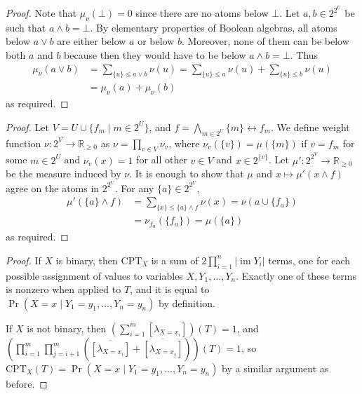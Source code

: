 \documentclass[letterpaper]{article} %
\DeclareMathOperator{\im}{im}
\theoremstyle{definition}
\theoremstyle{remark}
\begin{document}
{\measure*
\begin{proof}
  Note that $\mu_\nu(\bot) = 0$ since there are no atoms below $\bot$. Let $a, b
  \in 2^{2^{U}}$ be such that $a \land b = \bot$. By elementary properties of
  Boolean algebras, all atoms below $a \lor b$ are either below $a$ or below
  $b$. Moreover, none of them can be below both $a$ and $b$ because then they
  would have to be below $a \land b = \bot$. Thus
  \begin{align*}
    \mu_\nu(a \lor b) &= \sum_{\{u\} \le a \lor b} \nu(u) = \sum_{\{u\} \le a} \nu(u) + \sum_{\{u\} \le b} \nu(u) \\
                      &= \mu_\nu(a) + \mu_\nu(b)
  \end{align*}
  as required.
\end{proof}

\extendable*
\begin{proof}
  Let $V = U \cup \{ f_m \mid m \in 2^U \}$, and $f = \bigwedge_{m \in 2^U} \{ m
  \} \leftrightarrow f_m$. We define weight function $\nu\colon 2^V \to
  \mathbb{R}_{\ge 0}$ as $\nu = \prod_{v \in V} \nu_v$, where $\nu_v(\{v\}) =
  \mu(\{m\})$ if $v = f_m$ for some $m \in 2^U$ and $\nu_v(x) = 1$ for all other
  $v \in V$ and $x \in 2^{\{v\}}$. Let $\mu'\colon 2^{2^V} \to \mathbb{R}_{\ge
    0}$ be the measure induced by $\nu$. It is enough to show that $\mu$ and $x
  \mapsto \mu'(x \land f)$ agree on the atoms in $2^{2^U}$. For any $\{ a \} \in
  2^{2^U}$,
  \begin{align*}
    \mu'(\{ a \} \land f) &= \sum_{\{ x \} \le \{ a \} \land f} \nu(x) = \nu(a \cup \{ f_a \}) \\
                          &= \nu_{f_a}(\{ f_a \}) = \mu(\{ a \})
  \end{align*}
  as required.
\end{proof}

\cptlemma*
\begin{proof}
  If $X$ is binary, then $\mathrm{CPT}_X$ is a sum of $2\prod_{i=1}^n |\im
  Y_i|$ terms, one for each possible assignment of values to variables $X, Y_1,
  \dots, Y_n$. Exactly one of these terms is nonzero when applied to $T$, and
  it is equal to $\Pr(X = x \mid Y_1 = y_1, \dots, Y_n = y_n)$ by definition.

  If $X$ is not binary, then $\left( \sum_{i=1}^m [\lambda_{X = x_i}]
  \right)(T) = 1$, and $\left( \prod_{i=1}^m \prod_{j=i+1}^m
    (\overline{[\lambda_{X = x_i}]} + \overline{[\lambda_{X = x_j}]})
  \right)(T) = 1$, so $\mathrm{CPT}_X(T) = \Pr(X = x \mid Y_1 = y_1,
  \dots, Y_n = y_n)$ by a similar argument as before.
\end{proof}

}
\end{document}
